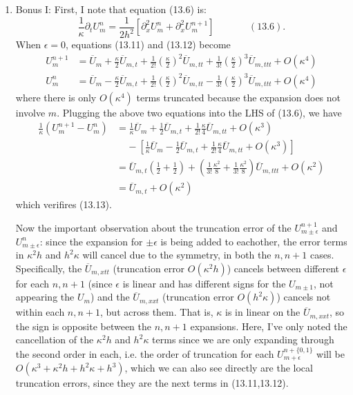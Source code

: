 \documentclass[11pt]{article}
\def\f{\frac }
\begin{document}
\begin{enumerate}
\clearpage
\pagebreak
\item Bonus I: First, I note that equation (13.6) is:
\[ \f{1}{\kappa} \partial _t U_{m}^{n} = \f{1}{2h^2} \left [ \partial _x ^2 U_{m}^{n} + \partial _x ^2 U_{m}^{n+1} \right ]~~~~~~~~~~~~~~~~(13.6).\]
When $\epsilon = 0$, equations (13.11) and (13.12) become
\begin{align*} U_{m}^{n+1} &= \overline{U}_{m} + \f{\kappa}{2} \overline{U}_{m,t} + \f{1}{2!} \left  ( \f{\kappa}{2} \right ) ^2 \overline{U}_{m,tt} + \f{1}{3!} \left  ( \f{\kappa}{2} \right ) ^3 \overline{U}_{m,ttt} + O (\kappa ^4) \\
U_{m}^{n} &= \overline{U}_{m} - \f{\kappa}{2} \overline{U}_{m,t} + \f{1}{2!} \left  ( \f{\kappa}{2} \right ) ^2 \overline{U}_{m,tt} - \f{1}{3!} \left  ( \f{\kappa}{2} \right ) ^3 \overline{U}_{m,ttt} + O (\kappa ^4) \end{align*}
where there is only $O(\kappa ^4)$ terms truncated because the expansion does not involve $m$.
Plugging the above two equations into the LHS of (13.6), we have 
\begin{align*} \f{1}{\kappa} \left ( U_{m} ^{n+1} - U_{m} ^{n} \right ) &= \f{1}{\kappa} \overline{U}_{m} + \f{1}{2} \overline{U}_{m,t} + \f{1}{2!} \f{\kappa}{4}  \overline{U}_{m,tt} + O (\kappa ^3)\\
&~~~~~- \left [ \f{1}{\kappa} \overline{U}_{m} - \f{1}{2} \overline{U}_{m,t} + \f{1}{2!} \f{\kappa}{4}  \overline{U}_{m,tt} + O (\kappa ^3) \right ]\\
&= \overline{U} _{m,t} \left ( \f{1}{2} + \f{1}{2} \right ) + \left ( \f{1}{3!} \f{\kappa ^2}{8} + \f{1}{3!} \f{\kappa ^2}{8} \right ) \overline{U}_{m,ttt} + O(\kappa ^2) \\
&= \overline{U} _{m,t} + O(\kappa ^2) \end{align*} 
which verifires (13.13).


Now the important observation about the truncation error of the $U_{m\pm \epsilon} ^{n+1}$ and $U_{m\pm \epsilon} ^n$: since the expansion for $\pm\epsilon$ is being added to eachother, the error terms in $\kappa^2 h$ and $h^2 \kappa$ will cancel due to the symmetry, in both the $n,n+1$ cases.
Specifically, the $\overline{U} _{m,xtt}$ (truncation error $O(\kappa ^2 h)$) cancels between different $\epsilon$ for each $n,n+1$ (since $\epsilon$ is linear and has different signs for the $U_{m\pm1}$, not appearing the $U_m$) and the $\overline{U} _{m,xxt}$ (truncation error $O(h^2 \kappa)$) cancels not within each $n,n+1$, but across them.
That is, $\kappa$ is in linear on the $\overline{U} _{m,xxt}$, so the sign is opposite between the $n,n+1$ expansions.
Here, I've only noted the cancellation of the $\kappa^2 h$ and $h^2 \kappa $ terms since we are only expanding through the second order in each, i.e. the order of truncation for each $U_{m+\epsilon} ^{n+\{0,1\}}$ will be $O(\kappa ^3 + \kappa ^2 h + h^2\kappa + h^3)$, which we can also see directly are the local truncation errors, since they are the next terms in (13.11,13.12).


\end{enumerate}
\end{document}
